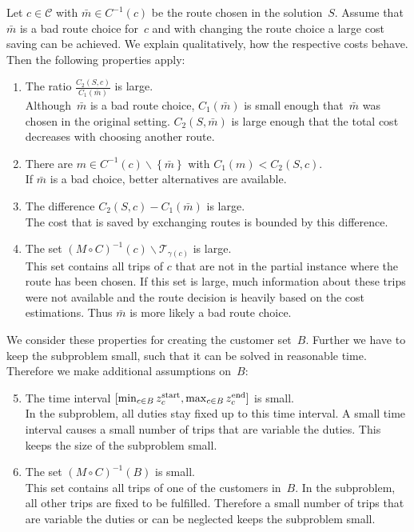 Let ${c\in\mathcal{C}}$ with ${\bar{m}\in C^{-1}(c)}$ be the route chosen in the solution~$S$. Assume that~$\bar{m}$ is a bad route choice for~$c$ and with changing the route choice a large cost saving can be achieved. We explain qualitatively, how the respective costs behave. Then the following properties apply:
\begin{enumerate}
	\item The ratio $\frac{C_2(S,c)}{C_1\left(\bar{m}\right)}$ is large. \\
	Although~$\bar{m}$ is a bad route choice, $C_1\left(\bar{m}\right)$ is small enough that~$\bar{m}$ was chosen in the original setting. $C_2\left(S,\bar{m}\right)$ is large enough that the total cost decreases with choosing another route.
	\item There are ${m\in C^{-1}(c)\backslash\left\{\bar{m}\right\}}$ with ${C_1(m)<C_2(S,c)}$. \\
	If $\bar{m}$ is a bad choice, better alternatives are available.
	\item The difference ${C_2(S,c) - C_1\left(\bar{m}\right)}$ is large. \\
	The cost that is saved by exchanging routes is bounded by this difference.
	\item The set ${(M\circ C)^{-1}(c)\backslash\mathcal{T}_{\gamma(c)}}$ is large. \\
	This set contains all trips of $c$ that are not in the partial instance where the route has been chosen. If this set is large, much information about these trips were not available and the route decision is heavily based on the cost estimations. Thus $\bar{m}$ is more likely a bad route choice.
\end{enumerate}

We consider these properties for creating the customer set~$B$. Further we have to keep the subproblem small, such that it can be solved in reasonable time. Therefore we make additional assumptions on~$B$:
\begin{enumerate}
\setcounter{enumi}{4}
	\item The time interval ${[\min_{c\in B}z^{\operatorname{start}}_c, \max_{c\in B}z^{\operatorname{end}}_c]}$ is small. \\
	In the subproblem, all duties stay fixed up to this time interval. A small time interval causes a small number of trips that are variable \wrt the duties. This keeps the size of the subproblem small.
	\item The set ${(M\circ C)^{-1}(B)}$ is small. \\
	This set contains all trips of one of the customers in~$B$. In the subproblem, all other trips are fixed to be fulfilled. Therefore a small number of trips that are variable \wrt the duties or can be neglected keeps the subproblem small.
\end{enumerate}

